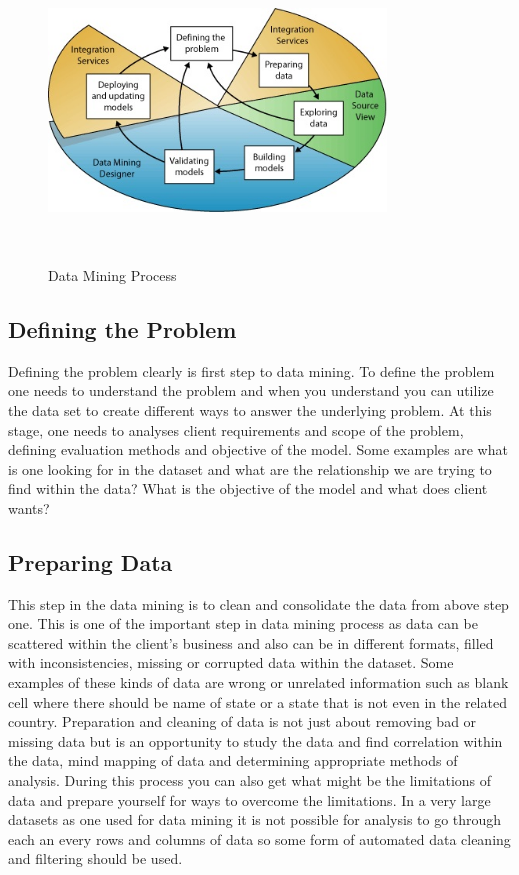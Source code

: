 \documentclass{article}
\begin{document}
\begin{figure}[h!]
	\centering
    \includegraphics[height= 8cm,width=0.8\textwidth]{data-mining-process.jpg}
    \caption[optional caption]{Data Mining Process}
    \label{fig:Data Mining Process}
\end{figure}

\subsection{Defining the Problem}\label{concept}

Defining the problem clearly is first step to data mining. To define the problem one needs to understand the problem and when you understand you can utilize the data set to create different ways to answer the underlying problem. At this stage, one needs to analyses client requirements and scope of the problem, defining evaluation methods and objective of the model. Some examples are what is one looking for in the dataset and what are the relationship we are trying to find within the data? What is the objective of the model and what does client wants?

\subsection{Preparing Data}\label{concept}	

This step in the data mining is to clean and consolidate the data from above step one. This is one of the important step in data mining process as data can be scattered within the client’s business and also can be in different formats, filled with inconsistencies, missing or corrupted data within the dataset. Some examples of these kinds of data are wrong or unrelated information such as blank cell where there should be name of state or a state that is not even in the related country. Preparation and cleaning of data is not just about removing bad or missing data but is an opportunity to study the data and find correlation within the data, mind mapping of data and determining appropriate methods of analysis. During this process you can also get what might be the limitations of  data and prepare yourself for ways to overcome the limitations. In a very large datasets as one used for data mining it is not possible for analysis to go through each an every rows and columns of data so some form of automated data cleaning and filtering should be used.
\end{document}

